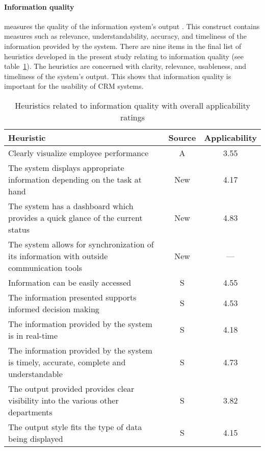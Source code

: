 \paragraph{Information quality} measures the quality of the information system's output \citep{DeLone1992}. This construct contains measures such as relevance, understandability, accuracy, and timeliness of the information provided by the system. There are nine items in the final list of heuristics developed in the present study relating to information quality (see table~\ref{tab:iq_heuristics}). The heuristics are concerned with clarity, relevance, usableness, and timeliness of the system's output. This shows that information quality is important for the usability of CRM systems.

\begin{table}[htb]
	\vspace{0.5cm}
	\centering
	\caption{Heuristics related to information quality with overall applicability ratings}
	\label{tab:iq_heuristics}
	\begin{tabularx}{\textwidth}{Xcc} \toprule
		\textbf{Heuristic} & \textbf{Source} & \textbf{Applicability} \\ \midrule
		Clearly visualize employee performance & A & 3.55 \\
		The system displays appropriate information depending on the task at hand & New & 4.17 \\
		The system has a dashboard which provides a quick glance of the current status & New & 4.83 \\
		The system allows for synchronization of its information with outside communication tools & New & --- \\
		Information can be easily accessed & S & 4.55 \\
		The information presented supports informed decision making & S & 4.53 \\
		The information provided by the system is in real-time & S & 4.18 \\
		The information provided by the system is timely, accurate, complete and understandable & S & 4.73 \\
		The output provided provides clear visibility into the various other departments & S & 3.82 \\
		The output style fits the type of data being displayed & S & 4.15 \\
		\bottomrule
	\end{tabularx}
\end{table}

